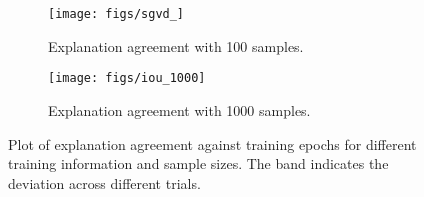 \begin{figure}[ht]
	\centering
	\begin{subfigure}[b]{0.3\textwidth}
		\centering
		\texttt{[image: figs/sgvd\_]}
		\caption{Explanation agreement with 100 samples.}
	\end{subfigure}
	\hfill
	\begin{subfigure}[b]{0.3\textwidth}
		\centering
		\texttt{[image: figs/iou\_1000]}
		\caption{Explanation agreement with 1000 samples.}
	\end{subfigure}
	\caption{Plot of explanation agreement against training epochs for different training information and sample sizes. The band indicates the deviation across different trials.}
	\label{fig:exp_agree_resp}
\end{figure}